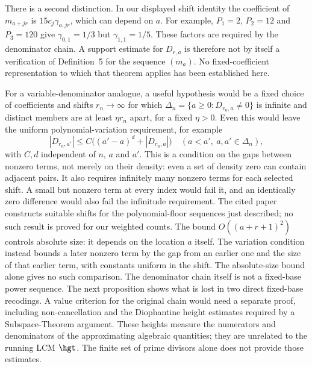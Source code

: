 There is a second distinction.  In our displayed shift identity the
coefficient of $m_{a+jr}$ is $15c_j\gamma_{a,jr}$, which can depend on $a$.
For example, $P_1=2$, $P_2=12$ and $P_3=120$ give
$\gamma_{0,1}=1/3$ but $\gamma_{1,1}=1/5$.  These factors are required by
the denominator chain.  A support estimate for $D_{r,a}$ is therefore not
by itself a verification of Definition~5 for the sequence $(m_a)$.
No fixed-coefficient representation to which that theorem applies has
been established here.

For a variable-denominator analogue, a useful hypothesis would be a fixed
choice of coefficients and shifts $r_n\to\infty$
for which $\Delta_n=\{a\ge0:D_{r_n,a}\ne0\}$ is infinite and distinct
members are at least $\eta r_n$ apart, for a fixed $\eta>0$.
Even this would leave the uniform polynomial-variation requirement, for
example
\[
 |D_{r_n,a'}|\le C\bigl((a'-a)^d+|D_{r_n,a}|\bigr)
 \quad(a<a',\ a,a'\in\Delta_n),
\]
with $C,d$ independent of $n$, $a$ and $a'$.
This is a condition on the gaps between nonzero terms, not merely on
their density: even a set of density zero can contain adjacent pairs.
It also requires infinitely many nonzero terms for each selected shift.  A small
but nonzero term at every index would fail it, and an identically zero
difference would also fail the infinitude requirement.  The cited paper
constructs suitable shifts for the polynomial-floor sequences just
described; no such result is proved for our weighted counts.  The bound $O((a+r+1)^2)$ controls
absolute size: it depends on the location $a$ itself.  The variation
condition instead bounds a later nonzero term by the gap from an earlier
one and the size of that earlier term, with constants uniform in the
shift.  The absolute-size bound alone gives no such comparison.
The denominator chain itself is not a fixed-base power sequence.  The
next proposition shows what is lost in two direct fixed-base recodings.
A value criterion for the original chain would need a separate proof,
including non-cancellation and the Diophantine height estimates required
by a Subspace-Theorem argument. These heights measure the numerators and
denominators of the approximating algebraic quantities; they are unrelated
to the running LCM $\hgt$.
The finite set of prime divisors alone does not provide those estimates.

